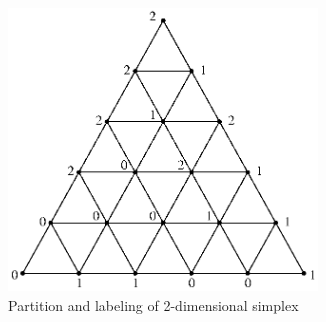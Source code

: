 \documentclass[reqno]{amsart}
\begin{document}
\begin{figure}[t]
\begin{center}
\includegraphics[height=7.5cm]{br-non2.eps}
\end{center}
	\vspace*{-.3cm}
	\caption{Partition and labeling of 2-dimensional simplex}
	\label{tria2}
\end{figure}
\end{document}
